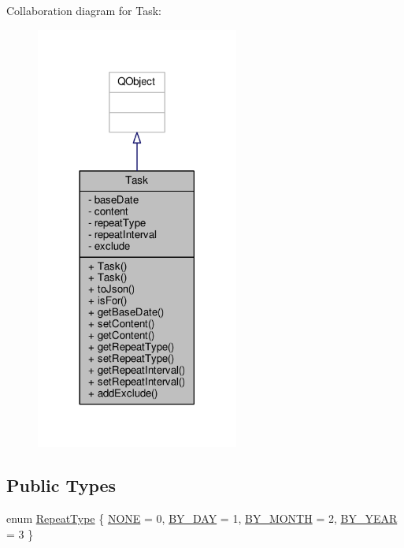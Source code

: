 Collaboration diagram for Task\+:
\nopagebreak
\begin{figure}[H]
\begin{center}
\leavevmode
\includegraphics[width=189pt]{classTask__coll__graph}
\end{center}
\end{figure}
\subsection*{Public Types}
\begin{DoxyCompactItemize}
\item 
enum \hyperlink{classTask_a93fe2c7346381e2e631fb2ba63ac0344}{Repeat\+Type} \{ \hyperlink{classTask_a93fe2c7346381e2e631fb2ba63ac0344a1489a46f05a9ab3e7aa6f14871244839}{N\+O\+NE} = 0, 
\hyperlink{classTask_a93fe2c7346381e2e631fb2ba63ac0344a80a9ff87a14a3a59573514ed327e5d6f}{B\+Y\+\_\+\+D\+AY} = 1, 
\hyperlink{classTask_a93fe2c7346381e2e631fb2ba63ac0344a1a1cd5e7a9aad514a1b530284a3a23fc}{B\+Y\+\_\+\+M\+O\+N\+TH} = 2, 
\hyperlink{classTask_a93fe2c7346381e2e631fb2ba63ac0344acddd3dcd814b4580446ae57f75bf73e9}{B\+Y\+\_\+\+Y\+E\+AR} = 3
 \}
\end{DoxyCompactItemize}
